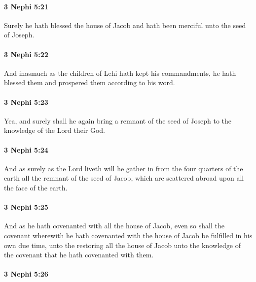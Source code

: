 		\paragraph{3 Nephi 5:21} %
			\label{3NEPHI-5-21}

			Surely he hath blessed the house of Jacob
			and hath been merciful unto the seed of Joseph.

		\paragraph{3 Nephi 5:22} %
			\label{3NEPHI-5-22}

			And inasmuch as the children of Lehi hath kept his commandments,
			he hath blessed them and prospered them according to his word.

		\paragraph{3 Nephi 5:23} %
			\label{3NEPHI-5-23}

			Yea, and surely shall he again bring a remnant of the seed of Joseph
			to the knowledge of the Lord their God.

		\paragraph{3 Nephi 5:24} %
			\label{3NEPHI-5-24}

			And as surely as the Lord liveth
			will he gather in from the four quarters of the earth
			all the remnant of the seed of Jacob,
			which are scattered abroad upon all the face of the earth.

		\paragraph{3 Nephi 5:25} %
			\label{3NEPHI-5-25}

			And as he hath covenanted with all the house of Jacob,
			even so shall the covenant
			wherewith he hath covenanted with the house of Jacob
			be fulfilled in his own due time,
			unto the restoring all the house of Jacob unto the knowledge of the covenant
			that he hath covenanted with them.

		\paragraph{3 Nephi 5:26} %
			\label{3NEPHI-5-26}

